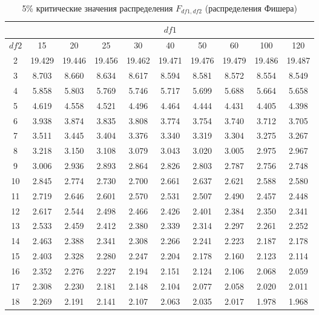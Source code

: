 \documentclass[12pt]{article}
\begin{document}
\begin{table}
\caption{5\% критические значения распределения $F_{df1,df2}$
(распределения Фишера) }
\begin{center}
{\footnotesize
\begin{tabular}{|c|c|c|c|c|c|c|c|c|c|}
	\hline
	& \multicolumn{9}{|c|}{$df1$} \\ \hline
	$df2$ & 15      & 20    &  25     &  30   &  40    &  50    &  60    &  100 & 120\\ \hline \hline
	2 & 19.429 &19.446 &19.456 & 19.462 & 19.471 &19.476 &19.479 &19.486 &19.487\\
	3 &  8.703 &8.660 &8.634 &  8.617 &  8.594 &8.581 &8.572 &8.554& 8.549\\
	4 & 5.858 &5.803 &5.769 &  5.746 &  5.717  & 5.699 &5.688 & 5.664 & 5.658\\
	5 & 4.619 &4.558 &4.521 &  4.496 &  4.464 &  4.444 &  4.431 &4.405 &4.398 \\
	6 & 3.938 &3.874 &3.835 &3.808  & 3.774  & 3.754 &  3.740 &3.712& 3.705\\
	7 & 3.511 &3.445 &3.404 &3.376 &3.340 &  3.319 &  3.304 &3.275& 3.267\\
	8 & 3.218& 3.150 &3.108 &3.079 &3.043 &3.020  & 3.005 &2.975 &2.967\\
	9 & 3.006 &2.936 &2.893 &2.864 &2.826 &2.803 &2.787 &2.756 &2.748\\
	10 & 2.845 &2.774 &2.730 &2.700 &2.661 &2.637 &2.621 &2.588 &2.580\\
	11 & 2.719 &2.646 &2.601 &2.570 &2.531 &2.507 &2.490 &2.457 &2.448\\
	12 & 2.617 &2.544 &2.498 &2.466 &2.426 &2.401 &2.384 &2.350 &2.341\\
	13 & 2.533 &2.459 &2.412 &2.380 &2.339 &2.314 &2.297 &2.261 &2.252\\
	14 & 2.463 &2.388 &2.341 &2.308 &2.266 &2.241 &2.223 &2.187 &2.178\\
	15 & 2.403 &2.328 &2.280 &2.247 &2.204 &2.178 &2.160 &2.123 &2.114\\
	16 & 2.352 &2.276 &2.227 &2.194 &2.151 &2.124 &2.106 &2.068 &2.059\\
	17 & 2.308 &2.230 &2.181 &2.148 &2.104 &2.077 &2.058 &2.020 &2.011\\
	18 & 2.269 &2.191 &2.141 &2.107 &2.063 &2.035 &2.017 &1.978 &1.968\\

\end{tabular}}
\end{center}
\end{table}
\end{document}
